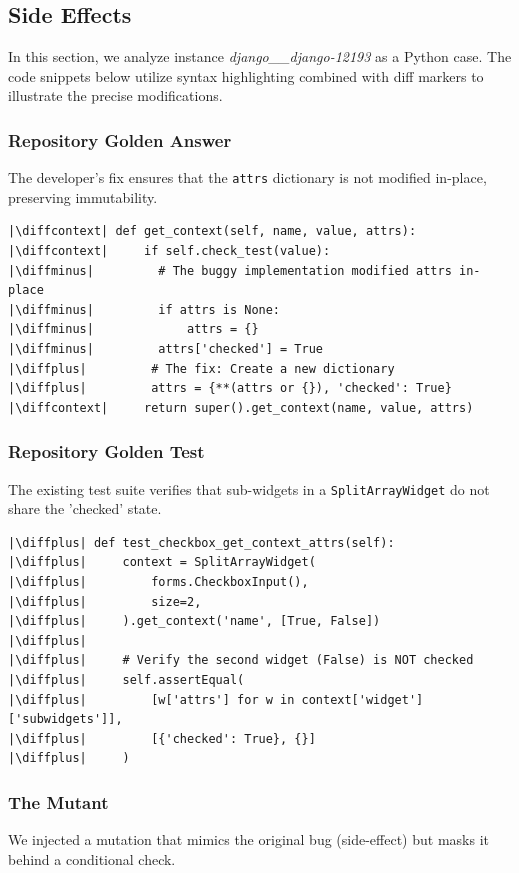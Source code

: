 \documentclass[11pt]{article}
\newcommand{\diffminus}{\textcolor{red}{-}}         %
\newcommand{\diffplus}{\textcolor{green!70!black}{+}} %
\newcommand{\diffcontext}{\phantom{+}}              %
\begin{document}
\subsection{Side Effects}
In this section, we analyze instance \textit{django\_\_django-12193} as a Python case. The code snippets below utilize syntax highlighting combined with diff markers to illustrate the precise modifications.
\subsubsection{Repository Golden Answer}
The developer's fix ensures that the \texttt{attrs} dictionary is not modified in-place, preserving immutability.

\begin{verbatim}
|\diffcontext| def get_context(self, name, value, attrs):
|\diffcontext|     if self.check_test(value):
|\diffminus|         # The buggy implementation modified attrs in-place
|\diffminus|         if attrs is None:
|\diffminus|             attrs = {}
|\diffminus|         attrs['checked'] = True
|\diffplus|         # The fix: Create a new dictionary
|\diffplus|         attrs = {**(attrs or {}), 'checked': True}
|\diffcontext|     return super().get_context(name, value, attrs)
\end{verbatim}

\subsubsection{Repository Golden Test}
The existing test suite verifies that sub-widgets in a \texttt{SplitArrayWidget} do not share the 'checked' state.

\begin{verbatim}
|\diffplus| def test_checkbox_get_context_attrs(self):
|\diffplus|     context = SplitArrayWidget(
|\diffplus|         forms.CheckboxInput(),
|\diffplus|         size=2,
|\diffplus|     ).get_context('name', [True, False])
|\diffplus|     
|\diffplus|     # Verify the second widget (False) is NOT checked
|\diffplus|     self.assertEqual(
|\diffplus|         [w['attrs'] for w in context['widget']['subwidgets']],
|\diffplus|         [{'checked': True}, {}]
|\diffplus|     )
\end{verbatim}

\subsubsection{The Mutant}
We injected a mutation that mimics the original bug (side-effect) but masks it behind a conditional check.
\end{document}

